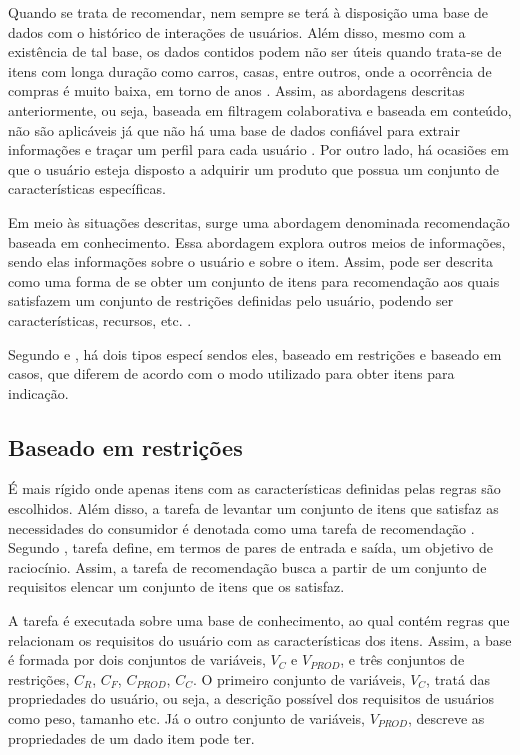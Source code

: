 Quando se trata de recomendar, nem sempre se terá à disposição uma base de dados com o histórico de interações de usuários. Além disso, mesmo com a existência de tal base,  os dados contidos podem não ser úteis quando trata-se de itens com longa duração como carros, casas, entre outros, onde a ocorrência de compras é muito baixa, em torno de anos \cite{Jannach2010}. Assim, as abordagens descritas anteriormente, ou seja, baseada em filtragem colaborativa e baseada em conteúdo, não são aplicáveis já que não há uma base de dados confiável para extrair informações e traçar um perfil para cada usuário  \cite{Ricci2010}. Por outro lado, há ocasiões em que o usuário esteja disposto a adquirir um produto que possua um conjunto de características específicas. 

Em meio às situações descritas, surge uma abordagem denominada recomendação baseada em conhecimento. Essa abordagem explora outros meios de informações, sendo elas informações sobre o usuário e sobre o item.
Assim, pode ser descrita como uma forma de se obter um conjunto de itens para recomendação aos quais satisfazem um conjunto de restrições definidas pelo usuário, podendo ser características, recursos, etc. \cite{Jannach2010}.

Segundo  e , há dois tipos especí sendos eles, baseado em restrições e baseado em casos, que diferem de acordo com o modo utilizado para obter itens para indicação.

\subsection{Baseado em restrições}
    É mais rígido onde apenas itens com as características definidas pelas regras são escolhidos. Além disso, a tarefa de levantar um conjunto de itens que satisfaz as necessidades do consumidor é denotada como uma tarefa de recomendação \cite{Ricci2010}. Segundo , tarefa define, em termos de pares de entrada e saída, um objetivo de raciocínio. Assim, a tarefa de recomendação busca a partir de um conjunto de requisitos elencar um conjunto de itens que os satisfaz.
    
    A tarefa é executada sobre uma base de conhecimento, ao qual contém regras que relacionam os requisitos do usuário com as características dos itens. Assim, a base é formada por dois conjuntos de variáveis, $V_C$ e $V_{PROD}$, e três conjuntos de restrições, $C_R$, $C_F$, $C_{PROD}$, $C_C$.
    O primeiro conjunto de variáveis, $V_C$, tratá das propriedades do usuário, ou seja, a descrição possível dos requisitos de usuários como peso, tamanho etc. Já o outro conjunto de variáveis, $V_{PROD}$, descreve as propriedades de um dado item pode ter.
    
